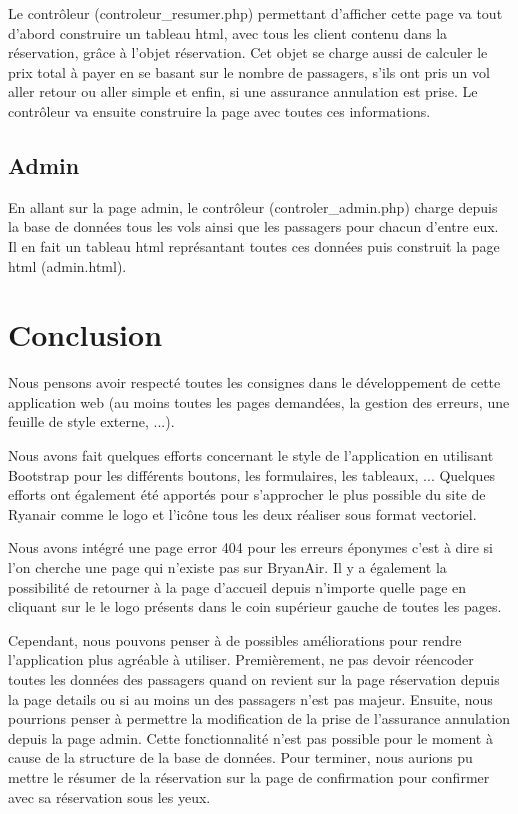 \documentclass[12pt,a4paper]{article}
\begin{document}
			Le contrôleur (controleur\_resumer.php) permettant d'afficher cette page va tout d'abord construire un tableau html, avec tous les client contenu dans la réservation, grâce à l'objet réservation. Cet objet se charge aussi de calculer le prix total à payer en se basant sur le nombre de passagers, s'ils ont pris un vol aller retour ou aller simple et enfin, si une assurance annulation est prise. Le contrôleur va ensuite construire la page avec toutes ces informations.

		\subsection{Admin}
			En allant sur la page admin, le contrôleur (controler\_admin.php) charge depuis la base de données tous les vols ainsi que les passagers pour chacun d'entre eux. Il en fait un tableau html représantant toutes ces données puis construit la page html (admin.html).

	\section*{Conclusion}
			Nous pensons avoir respecté toutes les consignes dans le développement de cette application web (au moins toutes les pages demandées, la gestion des erreurs, une feuille de style externe, ...).

			Nous avons fait quelques efforts concernant le style de l'application en utilisant Bootstrap pour les différents boutons, les formulaires, les tableaux, ... Quelques efforts ont également été apportés pour s'approcher le plus possible du site de Ryanair comme le logo et l'icône tous les deux réaliser sous format vectoriel.

      Nous avons intégré une page error 404 pour les erreurs éponymes c'est à dire si l'on cherche une page qui n'existe pas sur BryanAir. Il y a également la possibilité de retourner à la page d'accueil depuis n'importe quelle page en cliquant sur le le logo présents dans le coin supérieur gauche de toutes les pages.

			Cependant, nous pouvons penser à de possibles améliorations pour rendre l'application plus agréable à utiliser. Premièrement, ne pas devoir réencoder toutes les données des passagers quand on revient sur la page réservation depuis la page details ou si au moins un des passagers n'est pas majeur. Ensuite, nous pourrions penser à permettre la modification de la prise de l'assurance annulation depuis la page admin. Cette fonctionnalité n'est pas possible pour le moment à cause de la structure de la base de données. Pour terminer, nous aurions pu mettre le résumer de la réservation sur la page de confirmation pour confirmer avec sa réservation sous les yeux.
\end{document}
